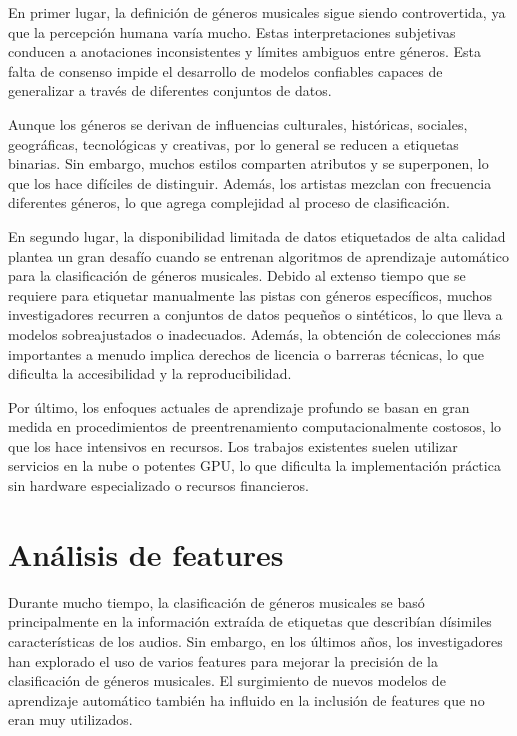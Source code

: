 \documentclass[colorinlistoftodos,twoside,twocolumn,10pt]{article} %
\begin{document}
En primer lugar, la definici\'on de g\'eneros musicales sigue siendo controvertida, ya que la percepci\'on humana var\'ia mucho. Estas interpretaciones subjetivas conducen a anotaciones inconsistentes  y l\'imites ambiguos entre g\'eneros. Esta falta de consenso impide el desarrollo de modelos confiables capaces de generalizar a trav\'es de diferentes conjuntos de datos.

Aunque los g\'eneros se derivan de influencias culturales, hist\'oricas, sociales, geogr\'aficas, tecnol\'ogicas y creativas, por lo general se reducen a etiquetas binarias. Sin embargo, muchos estilos comparten atributos y se superponen, lo que los hace dif\'iciles de distinguir. Adem\'as, los artistas mezclan con frecuencia diferentes g\'eneros, lo que agrega complejidad al proceso de clasificaci\'on.

En segundo lugar, la disponibilidad limitada de datos etiquetados de alta calidad plantea un gran desaf\'io cuando se entrenan algoritmos de aprendizaje autom\'atico para la clasificaci\'on de g\'eneros musicales. Debido al extenso tiempo que se requiere para etiquetar manualmente las pistas con g\'eneros espec\'ificos, muchos investigadores recurren a conjuntos de datos peque\~nos o sint\'eticos, lo que lleva a modelos sobreajustados o inadecuados. Adem\'as, la obtenci\'on de colecciones m\'as importantes a menudo implica derechos de licencia o barreras t\'ecnicas, lo que dificulta la accesibilidad y la reproducibilidad.

Por \'ultimo, los enfoques actuales de aprendizaje profundo se basan en gran medida en procedimientos de preentrenamiento computacionalmente costosos, lo que los hace intensivos en recursos. Los trabajos existentes suelen utilizar servicios en la nube o potentes GPU, lo que dificulta la implementaci\'on pr\'actica sin hardware especializado o recursos financieros. 
	
\section{An\'alisis de features} 
Durante mucho tiempo, la clasificaci\'on de g\'eneros musicales se bas\'o principalmente en la informaci\'on extra\'ida de etiquetas que describ\'ian d\'isimiles caracter\'isticas de los audios. Sin embargo, en los últimos años, los investigadores han explorado el uso de varios features para mejorar la precisión de la clasificación de géneros musicales. El surgimiento de nuevos modelos de aprendizaje autom\'atico tambi\'en ha influido en la inclusi\'on de features que no eran muy utilizados.
\end{document}
